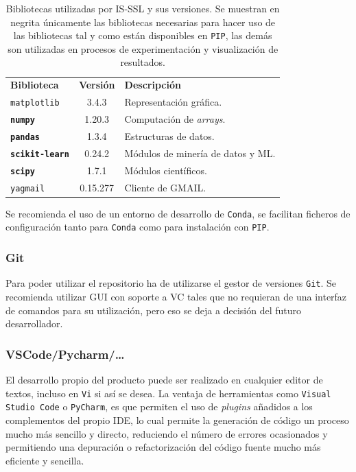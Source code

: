 \begin{table}[]
\centering
\begin{tabular}{lcl}
	\toprule
	\textbf{Biblioteca} & \textbf{Versión} & \textbf{Descripción}\\ \rowcolor[HTML]{EFEFEF} 
	\midrule
	\rowcolor[HTML]{EFEFEF} 
	\texttt{matplotlib}    & 3.4.3   & Representación gráfica.   \\  
	\textbf{\texttt{numpy}}    & 1.20.3 &  Computación de \textit{arrays}.  \\ \rowcolor[HTML]{EFEFEF} 
	\textbf{\texttt{pandas}}    & 1.3.4  & Estructuras de datos.    \\  
	\textbf{\texttt{scikit-learn}}    & 0.24.2 & Módulos de minería de datos y ML.   \\ \rowcolor[HTML]{EFEFEF} 
	\textbf{\texttt{scipy}}    & 1.7.1  & Módulos científicos.    \\ 
	\texttt{yagmail}    & 0.15.277  & Cliente de GMAIL.    \\ 
	\bottomrule
\end{tabular}
\caption{Bibliotecas utilizadas por IS-SSL y sus versiones. Se muestran en negrita únicamente las bibliotecas necesarias para hacer uso de las bibliotecas tal y como están disponibles en \texttt{PIP}, las demás son utilizadas en procesos de experimentación y visualización de resultados.}\label{tab:bibliotecas-python-is-ssl}
\end{table}

Se recomienda el uso de un entorno de desarrollo de \texttt{Conda}, se facilitan ficheros de configuración tanto para \texttt{Conda} como para instalación con \texttt{PIP}.

\subsubsection{Git}
Para poder utilizar el repositorio ha de utilizarse el gestor de versiones \texttt{Git}. Se recomienda utilizar GUI con soporte a VC tales que no requieran de una interfaz de comandos para su utilización, pero eso se deja a decisión del futuro desarrollador.

\subsubsection{VSCode/Pycharm/\dots}
El desarrollo propio del producto puede ser realizado en cualquier editor de textos, incluso en \texttt{Vi} si así se desea. La ventaja de herramientas como \texttt{Visual Studio Code} o \texttt{PyCharm}, es que permiten el uso de \textit{plugins} añadidos a los complementos del propio IDE, lo cual permite la generación de código un proceso mucho más sencillo y directo, reduciendo el número de errores ocasionados y permitiendo una depuración o refactorización del código fuente mucho más eficiente y sencilla.

